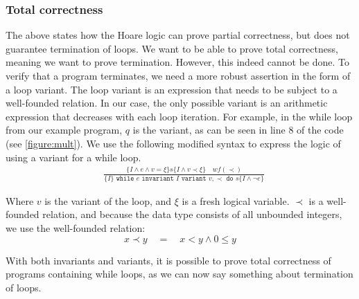 \subsubsection{Total correctness}\label{sec:total-correctness}
The above states how the Hoare logic can prove partial correctness, but does not guarantee termination of loops.
We want to be able to prove total correctness, meaning we want to prove termination. However, this indeed cannot be done.
To verify that a program terminates, we need a more robust assertion in the form of a loop variant.
The loop variant is an expression that needs to be subject to a well-founded relation. In our case, the only possible variant is an arithmetic expression that decreases with each loop iteration. For example, in the while loop from our example program, $q$ is the variant, as can be seen in line 8 of the code (see \cref{figure:mult}).
We use the following modified syntax to express the logic of using a variant for a while loop.
\begin{equation}\label{eq:totalwhile}
\begin{align*}
  &\frac{
    \{I \land e \land v = \xi \} s \{I \land v \prec \xi \} \quad wf(\prec)
  }{
    \{I\} \texttt{ while } e \texttt{ invariant } I 
          \texttt{ variant } v, \prec \texttt{ do } s \{I \land \neg e\}
  }
\end{align*}
\end{equation}

Where $v$ is the variant of the loop, and $\xi$ is a fresh logical variable. $\prec$ is a well-founded relation, and because the data type consists of all unbounded integers, we use the well-founded relation\cite{wlp}:
$$x \prec y \quad = \quad x < y \land 0 \leq y $$

With both invariants and variants, it is possible to prove total correctness of programs containing while loops, as we can now say something about termination of loops.
